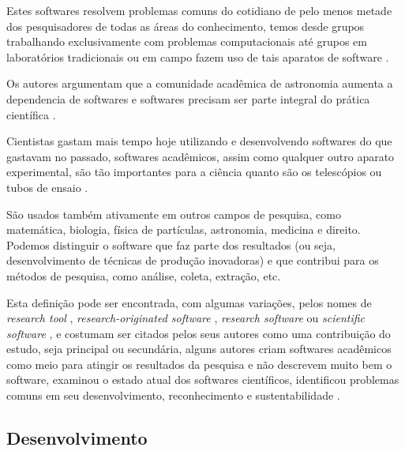 Estes softwares resolvem problemas comuns do cotidiano de pelo menos metade dos
pesquisadores de todas as áreas do conhecimento, temos desde grupos trabalhando
exclusivamente com problemas computacionais até grupos em laboratórios
tradicionais ou em campo fazem uso de tais aparatos de software
\cite{wilson2014best}.

Os autores argumentam que a comunidade acadêmica de astronomia aumenta a
dependencia de softwares e softwares precisam ser parte integral do prática
científica \cite{momcheva2015software}.

Cientistas gastam mais tempo hoje utilizando e desenvolvendo softwares do que
gastavam no passado, softwares acadêmicos, assim como qualquer outro aparato
experimental, são tão importantes para a ciência quanto são os telescópios ou
tubos de ensaio \cite{wilson2014best}.

São usados também ativamente em outros campos de pesquisa, como matemática,
biologia, física de partículas, astronomia, medicina e direito. Podemos
distinguir o software que faz parte dos resultados (ou seja, desenvolvimento de
técnicas de produção inovadoras) e que contribui para os métodos de pesquisa,
como análise, coleta, extração, etc.


Esta definição pode ser encontrada, com algumas variações, pelos nomes de
{\it research tool} \cite{Portillo12},
{\it research-originated software} \cite{Kon2011},
{\it research software} \cite{hettrick_2014_14809} ou
{\it scientific software} \cite{segal2008developing},
e costumam ser citados
pelos seus autores como uma contribuição do estudo, seja principal ou
secundária, alguns autores criam softwares acadêmicos como meio para atingir os
resultados da pesquisa e não descrevem muito bem o software,
examinou o estado atual dos softwares científicos, identificou problemas comuns
em seu desenvolvimento, reconhecimento e
sustentabilidade \cite{allen2017engineering}.

\subsection{Desenvolvimento}


